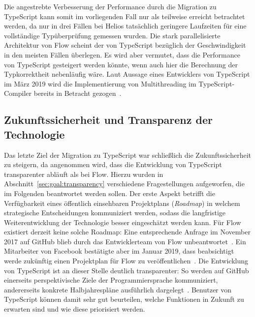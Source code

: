 Die angestrebte Verbesserung der Performance durch die Migration zu TypeScript kann somit im vorliegenden Fall nur als teilweise erreicht betrachtet werden, da nur in drei Fällen bei Helios tatsächlich geringere Laufzeiten für eine vollständige Typüberprüfung gemessen wurden. Die stark parallelisierte Architektur von Flow scheint der von TypeScript bezüglich der Geschwindigkeit in den meisten Fällen überlegen. Es wird aber vermutet, dass die Performance von TypeScript gesteigert werden könnte, wenn auch hier die Berechnung der Typkorrektheit nebenläufig wäre. Laut Aussage eines Entwicklers von TypeScript im März 2019 wird die Implementierung von Multithreading im TypeScript-Compiler bereits in Betracht gezogen~\autocite{TS:MULTICORE}.

\subsection{Zukunftssicherheit und Transparenz der Technologie}

Das letzte Ziel der Migration zu TypeScript war schließlich die Zukunftssicherheit zu steigern, da angenommen wird, dass die Entwicklung von TypeScript transparenter abläuft als bei Flow. Hierzu wurden in Abschnitt~\ref{sec:goal:transparency} verschiedene Fragestellungen aufgeworfen, die im Folgenden beantwortet werden sollen.
Der erste Aspekt betrifft die Verfügbarkeit eines öffentlich einsehbaren Projektplans (\textit{Roadmap}) in welchem strategische Entscheidungen kommuniziert werden, sodass die langfristige Weiterentwicklung der Technologie besser eingeschätzt werden kann. Für Flow existiert derzeit keine solche Roadmap: Eine entsprechende Anfrage im November 2017 auf GitHub blieb durch das Entwicklerteam von Flow unbeantwortet~\autocite{FLOW:GITHUB:ROADMAP}. Ein Mitarbeiter von Facebook bestätigte aber im Januar 2019, dass beabsichtigt werde zukünftig einen Projektplan für Flow zu veröffentlichen~\autocite{FLOW:GITHUB:ROADMAP_FUTURE}. Die Entwicklung von TypeScript ist an dieser Stelle deutlich transparenter: So werden auf GitHub einerseits perspektivische Ziele der Programmiersprache kommuniziert, andererseits konkrete Halbjahrespläne ausführlich dargelegt~\autocite{TS:ROADMAP}. Benutzer von TypeScript können damit sehr gut beurteilen, welche Funktionen in Zukunft zu erwarten sind und wie diese priorisiert werden.

